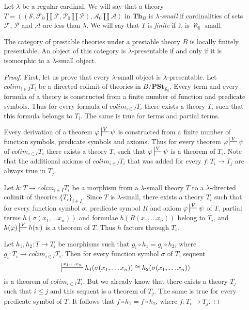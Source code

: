 \documentclass[reqno]{amsart}
\theoremstyle{definition}
\theoremstyle{remark}
\newcommand{\cat}[1]{\mathbf{#1}}
\newcommand{\Th}{\cat{Th}}
\newcommand{\PSt}{\cat{PSt}}
\numberwithin{figure}{section}
\begin{document}
Let $\lambda$ be a regular cardinal.
We will say that a theory $T = ((\mathcal{S}, \mathcal{F}_0 \amalg \mathcal{F}, \mathcal{P}_0 \amalg \mathcal{P}), \mathcal{A}_0 \amalg \mathcal{A})$
in $\Th_B$ is \emph{$\lambda$-small} if cardinalities of sets $\mathcal{F}$, $\mathcal{P}$ and $\mathcal{A}$ are less than $\lambda$.
We will say that $T$ is \emph{finite} if it is $\aleph_0$-small.

\begin{prop}
The category of prestable theories under a prestable theory $B$ is locally finitely presentable.
An object of this category is $\lambda$-presentable if and only if it is isomorphic to a $\lambda$-small object.
\end{prop}
\begin{proof}
First, let us prove that every $\lambda$-small object is $\lambda$-presentable.
Let $colim_{i \in I} T_i$ be a directed colimit of theories in $B/\PSt_{\mathcal{S}_0}$.
Every term and every formula of a theory is constructed from a finite number of function and predicate symbols.
Thus for every formula of $colim_{i \in I} T_i$ there exists a theory $T_i$ such that this formula belongs to $T_i$.
The same is true for terms and partial terms.

Every derivation of a theorem $\varphi \sststile{}{V} \psi$ is constructed from a finite number of function symbols, predicate symbols and axioms.
Thus for every theorem $\varphi \sststile{}{V} \psi$ of $colim_{i \in I} T_i$ there exists a theory $T_i$ such that $\varphi \sststile{}{V} \psi$ is a theorem of $T_i$.
Note that the additional axioms of $colim_{i \in I} T_i$ that was added for every $f : T_i \to T_j$ are always true in $T_j$.

Let $h : T \to colim_{i \in I} T_i$ be a morphism from a $\lambda$-small theory $T$ to a $\lambda$-directed colimit of theories $\{ T_i \}_{i \in I}$.
Since $T$ is $\lambda$-small, there exists a theory $T_i$ such that for every function symbol $\sigma$, predicate symbol $R$ and axiom $\varphi \sststile{}{V} \psi$ of $T$,
partial terms $h(\sigma(x_1, \ldots x_n))$ and formulae $h(R(x_1, \ldots x_n))$ belong to $T_i$, and $h(\varphi) \sststile{}{V} h(\psi)$ is a theorem of $T$.
Thus $h$ factors through $T_i$.

Let $h_1,h_2 : T \to T_i$ be morphisms such that $g_i \circ h_1 = g_i \circ h_2$, where $g_i : T_i \to colim_{i \in I} T_i$.
Then for every function symbol $\sigma$ of $T$, sequent
\[ \sststile{}{x_1, \ldots x_n} h_1(\sigma(x_1, \ldots x_n)) \cong h_2(\sigma(x_1, \ldots x_n)) \]
is a theorem of $colim_{i \in I} T_i$.
But we already know that there exists a theory $T_j$ such that $i \leq j$ and this sequent is a theorem of $T_j$.
The same is true for every predicate symbol of $T$.
It follows that $f \circ h_1 = f \circ h_2$, where $f : T_i \to T_j$.


\end{proof}
\end{document}
